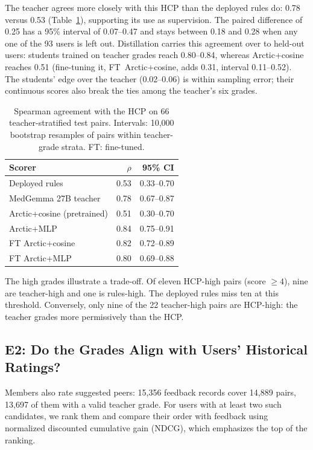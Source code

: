 \documentclass[runningheads,a4paper]{llncs}
\newcommand{\model}[1]{{\hyphenpenalty=10000 \exhyphenpenalty=10000 \textsf{#1}}}
\begin{document}
The teacher agrees more closely with this HCP than the deployed rules do:
0.78 versus 0.53 (Table~\ref{tab:expert-ecir}), supporting its use as supervision.
The paired difference of 0.25 has a 95\% interval of 0.07--0.47 and stays
between 0.18 and 0.28 when any one of the 93 users is left out. Distillation
carries this agreement over to held-out users: students trained on teacher
grades reach 0.80--0.84, whereas \model{Arctic+cosine} reaches 0.51
(fine-tuning it, \model{FT~Arctic+cosine}, adds 0.31, interval 0.11--0.52). The students' edge over the
teacher (0.02--0.06) is within sampling error; their continuous scores also
break the ties among the teacher's six grades.

\begin{table}[!htb]
\caption{Spearman agreement with the HCP on 66 teacher-stratified test pairs.
Intervals: 10,000 bootstrap resamples of pairs within teacher-grade strata.
FT: fine-tuned.}
\label{tab:expert-ecir}
\centering
\setlength{\tabcolsep}{5pt}
\begin{tabular}{lrr}
\toprule
Scorer & $\rho$ & 95\% CI \\
\midrule
Deployed rules & 0.53 & 0.33--0.70 \\
MedGemma 27B teacher & 0.78 & 0.67--0.87 \\
\model{Arctic+cosine (pretrained)} & 0.51 & 0.30--0.70 \\
\model{Arctic+MLP} & 0.84 & 0.75--0.91 \\
\model{FT Arctic+cosine} & 0.82 & 0.72--0.89 \\
\model{FT Arctic+MLP} & 0.80 & 0.69--0.88 \\
\bottomrule
\end{tabular}
\end{table}

The high grades illustrate a trade-off.
Of eleven HCP-high pairs (score $\geq4$), nine are teacher-high and one is
rules-high. The deployed rules miss ten at this threshold.
Conversely, only nine of the 22 teacher-high pairs are HCP-high: the teacher
grades more permissively than the HCP.

\subsection{E2: Do the Grades Align with Users' Historical Ratings?}
\label{sec:ratings}
Members also rate suggested peers: 15,356 feedback records cover 14,889 pairs,
13,697 of them with a valid teacher grade. For users with at least two such
candidates, we rank them and compare their order with feedback using normalized
discounted cumulative gain (NDCG), which emphasizes the top of the ranking.
\end{document}

